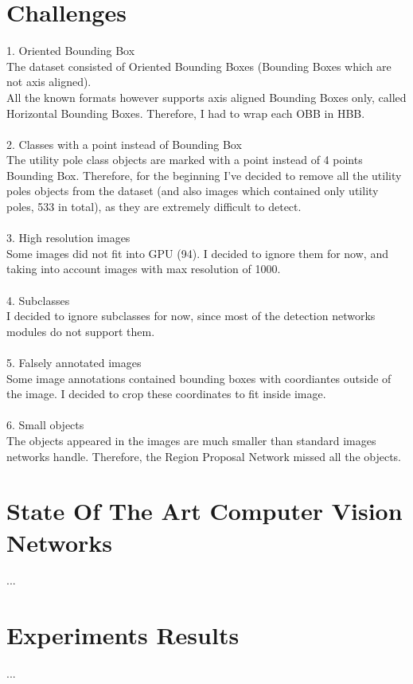 \documentclass[]{article}
\begin{document}
\section{Challenges}
1. Oriented Bounding Box \\
The dataset consisted of Oriented Bounding Boxes (Bounding Boxes which are not axis aligned). \\
All the known formats however supports axis aligned Bounding Boxes only, called Horizontal Bounding Boxes. 
Therefore, I had to wrap each OBB in HBB.
\\\\
2. Classes with a point instead of Bounding Box\\
The utility pole class objects are marked with a point instead of 4 points Bounding Box. Therefore, for the beginning I've decided to remove all the utility poles objects from the dataset (and also images which contained only utility poles, 533 in total), as they are extremely difficult to detect.
\\\\
3. High resolution images\\
Some images did not fit into GPU (94). I decided to ignore them for now, and taking into account images with max resolution of 1000.
\\\\
4. Subclasses\\
I decided to ignore subclasses for now, since most of the detection networks modules do not support them.
\\\\
5. Falsely annotated images\\
Some image annotations contained bounding boxes with coordiantes outside of the image. I decided to crop these coordinates to fit inside image.
\\\\
6. Small objects\\
The objects appeared in the images are much smaller than standard images networks handle. Therefore, the Region Proposal Network missed all the objects.
\section{State Of The Art Computer Vision Networks}
...

\section{Experiments Results}
...
\end{document}
